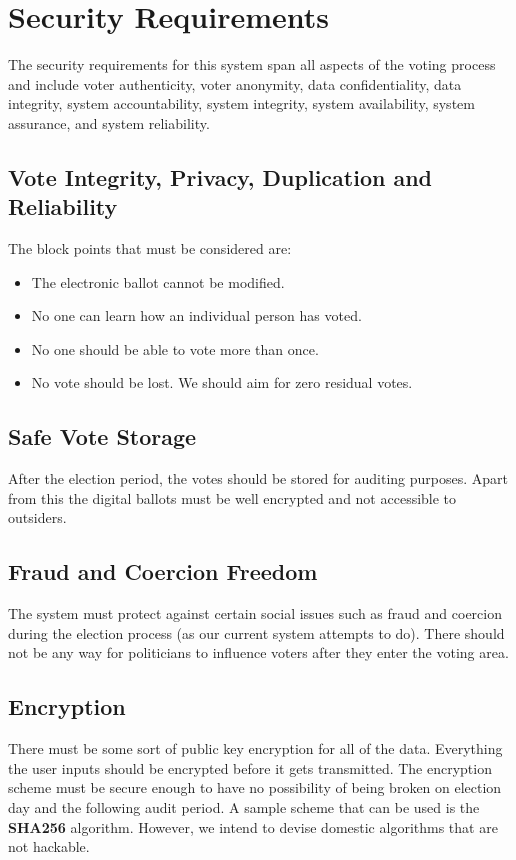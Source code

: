 \documentclass[a4paper,12pt]{extarticle}
\begin{document}
\section{Security Requirements}

The security requirements for this system span all aspects of the voting process and
include voter authenticity, voter anonymity, data confidentiality, data integrity, system accountability, system integrity, system availability, system assurance, and system reliability.


\subsection{Vote Integrity, Privacy, Duplication and Reliability}
The block points that must be considered are:
\begin{itemize}
\item The electronic ballot cannot be modified.
\item No one can learn how an individual person has voted.
\item No one should be able to vote more than once.
\item No vote should be lost. We should aim for zero residual votes.
\end{itemize}


\subsection{Safe Vote Storage}
After the election period, the votes should be stored for auditing purposes. Apart from this the digital ballots must be well encrypted and not accessible to outsiders.

\subsection{Fraud and Coercion Freedom}

 The system must protect against certain social issues such as fraud and coercion during the election process (as our current system attempts to do).  There should not be any way for politicians to influence voters after they enter the voting area.
 
\subsection{Encryption}

There must be some sort of public key encryption for all of the data.  Everything the user inputs should be encrypted before it gets transmitted.  The encryption scheme must be secure enough to have no possibility of being broken on election day and the following audit period. A sample scheme that can be used is the \textbf{SHA256} algorithm. However, we intend to devise domestic algorithms that are not hackable.
\end{document}
